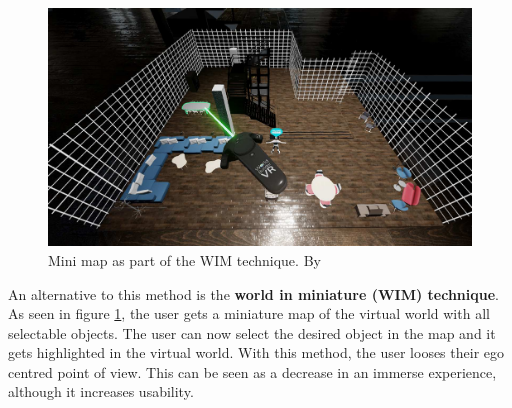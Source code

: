 \begin{figure}[h!]
  \includegraphics[width=14cm]{kapitel/eps/mini-map.pdf}
  \centering
  \caption{Mini map as part of the WIM technique. By \cite{Arnowitz.2017}}
  \label{fig:minimap}
\end{figure}
An alternative to this method is the \textbf{world in miniature (WIM) technique}. As seen in figure \ref{fig:minimap}, the user gets a miniature map of the virtual world with all selectable objects. The user can now select the desired object in the map and it gets highlighted in the virtual world. With this method, the user looses their ego centred point of view. This can be seen as a decrease in an immerse experience, although it increases usability.

